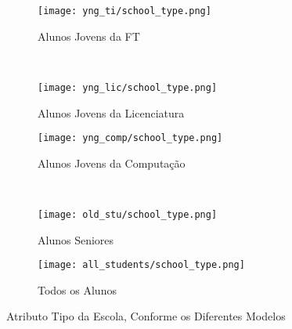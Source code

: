 \clearpage
\begin{figure}[!ht]
    \centering
    \begin{subfigure}[b]{0.48\textwidth}
        \centering
        \texttt{[image: yng\_ti/school\_type.png]}
        \caption{Alunos Jovens da FT}
    \end{subfigure}
    ~
    \begin{subfigure}[b]{0.48\textwidth}
        \centering
        \texttt{[image: yng\_lic/school\_type.png]}
        \caption{Alunos Jovens da Licenciatura}
    \end{subfigure}

    \begin{subfigure}[b]{0.48\textwidth}
        \centering
        \texttt{[image: yng\_comp/school\_type.png]}
        \caption{Alunos Jovens da Computação}
    \end{subfigure}
    ~
    \begin{subfigure}[b]{0.48\textwidth}
        \centering
        \texttt{[image: old\_stu/school\_type.png]}
        \caption{Alunos Seniores}
    \end{subfigure}

    \begin{subfigure}[b]{0.48\textwidth}
        \centering
        \texttt{[image: all\_students/school\_type.png]}
        \caption{Todos os Alunos}
    \end{subfigure}
    \caption{Atributo Tipo da Escola, Conforme os Diferentes Modelos}
\end{figure}

